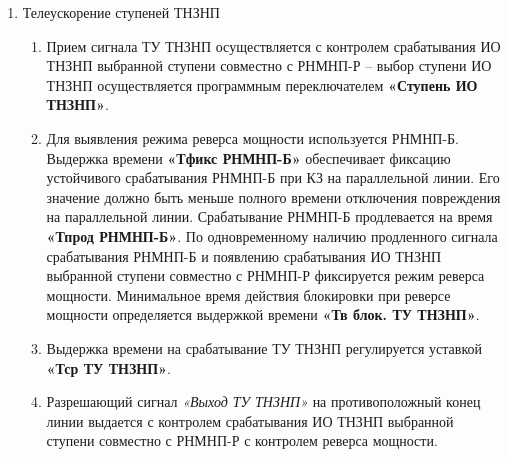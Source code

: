 \begin{enumerate}[label=\arabic{section}.\arabic{subsection}.\arabic{enumi}, labelsep=4pt, leftmargin=0pt, itemindent=57pt, itemsep=0pt, parsep=5pt]
\begin{enumerate}[label=\arabic{section}.\arabic{subsection}.\arabic{enumi}.\arabic*, labelsep=4pt, leftmargin=0em, itemindent=65pt, parsep=0pt]
\item
Режим работы эхо-логики и ЛОСК для ТУ ДЗ определяется положением программного переключателя «Режим эхо ТУ ДЗ», имеющим три положения:
\begin{enumerate}[label=\arabic*)]
    \item   \textit{Откл.} -- эхо-логика и ЛОСК выведены из работы;
    \item   \textit{Эхо} -- в работу введена только эхо-логика;
    \item   \textit{Эхо + ЛОСК} -- в работу введены и эхо-логика, и ЛОСК.
\end{enumerate}

\end{enumerate}

\item Телеускорение ступеней ТНЗНП
\begin{enumerate}[label=\arabic{section}.\arabic{subsection}.\arabic{enumi}.\arabic*, labelsep=4pt, leftmargin=0em, itemindent=65pt, parsep=0pt]

\item
Прием сигнала ТУ ТНЗНП осуществляется с контролем срабатывания ИО ТНЗНП выбранной ступени совместно с РНМНП-Р -- выбор ступени ИО ТНЗНП осуществляется программным переключателем 
\textbf{«Ступень ИО ТНЗНП»}.

\item
Для выявления режима реверса мощности используется РНМНП-Б. Выдержка времени \textbf{«Тфикс РНМНП-Б»} обеспечивает фиксацию устойчивого срабатывания РНМНП-Б при КЗ на параллельной линии. Его значение должно быть меньше полного времени отключения повреждения на параллельной линии. Срабатывание РНМНП-Б продлевается на время \textbf{«Тпрод РНМНП-Б»}. По одновременному наличию продленного сигнала срабатывания РНМНП-Б и появлению срабатывания ИО ТНЗНП выбранной ступени совместно с РНМНП-Р фиксируется режим реверса мощности. Минимальное время действия блокировки при реверсе мощности определяется выдержкой времени \textbf{«Тв блок. ТУ ТНЗНП»}. 

\item
Выдержка времени на срабатывание ТУ ТНЗНП регулируется уставкой \textbf{«Тср ТУ ТНЗНП»}.

\item
Разрешающий сигнал \textit{«Выход ТУ ТНЗНП»} на противоположный конец линии выдается с контролем срабатывания ИО ТНЗНП выбранной ступени совместно с РНМНП-Р с контролем реверса мощности.


\end{enumerate}
\end{enumerate}
